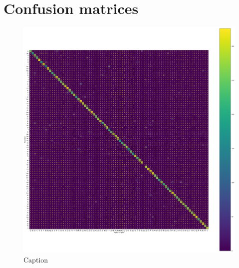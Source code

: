 

\chapter{Confusion matrices} %

\label{ApendixB} %


\begin{figure}
    \centering
    \includegraphics[width=\textwidth]{Figures/CM_CNN_1L.png}
    \caption{Caption}
    \label{fig:enter-label}
\end{figure}
